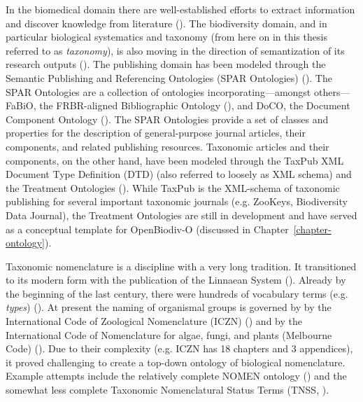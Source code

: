 In the biomedical domain there are well-established efforts to extract information and discover knowledge from literature (\cite{momtchev_expanding_2009, williams_open_2012, rebholz-schuhmann_facts_2005}). The biodiversity domain, and in particular biological systematics and taxonomy (from here on in this thesis referred to as \emph{taxonomy}), is also moving in the direction of semantization of its research outputs (\cite{kennedy_scientific_2005,penev_fast_2010, tzitzikas_integrating_2013}). The publishing domain has been modeled through the Semantic Publishing and Referencing Ontologies (SPAR Ontologies) (\cite{peroni_semantic_2014}). The SPAR Ontologies are a collection of ontologies incorporating---amongst others---FaBiO, the FRBR-aligned Bibliographic Ontology (\cite{peroni_fabio_2012}), and DoCO, the Document Component Ontology (\cite{constantin_document_2016}). The SPAR Ontologies provide a set of classes and properties for the description of general-purpose journal articles, their components, and related publishing resources. Taxonomic articles and their components, on the other hand, have been modeled through the TaxPub XML Document Type Definition (DTD) (also referred to loosely as XML schema) and the Treatment Ontologies (\cite{catapano_taxpub:_2010}). While TaxPub is the XML-schema of taxonomic publishing for several important taxonomic journals (e.g. ZooKeys, Biodiversity Data Journal), the Treatment Ontologies are still in development and have served as a conceptual template for OpenBiodiv-O (discussed in Chapter~\ref{chapter-ontology}). 

Taxonomic nomenclature is a discipline with a very long tradition. It transitioned to its modern form with the publication of the Linnaean System (\cite{linnaeus_systema_1758}). Already by the beginning of the last century, there were hundreds of vocabulary terms (e.g. \emph{types}) (\cite{witteveen_naming_2015}). At present the naming of organismal groups is governed by by the International Code of Zoological Nomenclature (ICZN) (\cite{international_commission_on_zoological_nomenclature_international_1999}) and by the International Code of Nomenclature for algae, fungi, and plants (Melbourne Code) (\cite{mcneill_international_2012}). Due to their complexity (e.g. ICZN has 18 chapters and 3 appendices), it proved challenging to create a top-down ontology of biological nomenclature. Example attempts include the relatively complete NOMEN ontology (\cite{dmitriev_nomen_2017}) and the somewhat less complete Taxonomic Nomenclatural Status Terms (TNSS, \cite{morris_taxonomic_nodate}).

